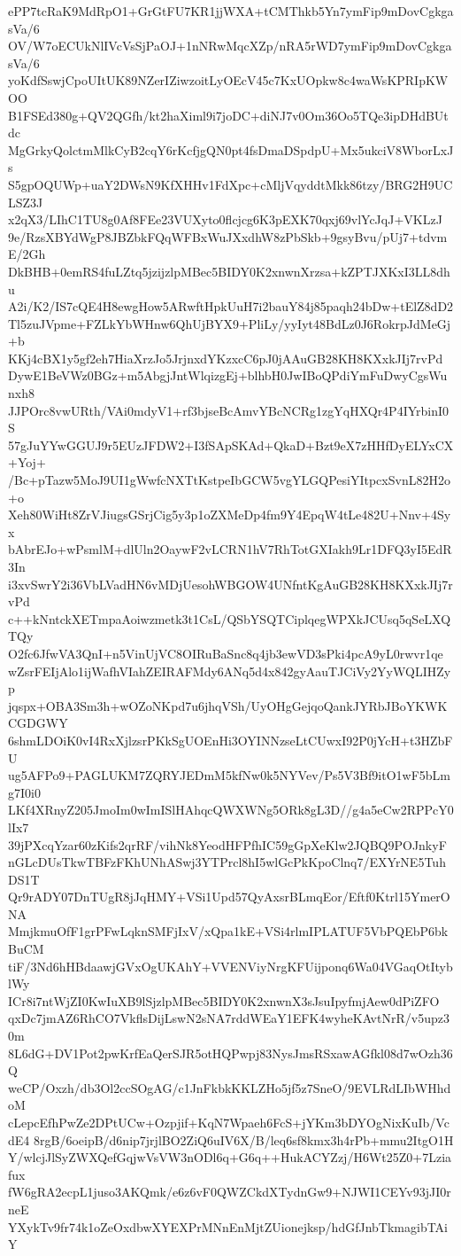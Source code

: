 ePP7tcRaK9MdRpO1+GrGtFU7KR1jjWXA+tCMThkb5Yn7ymFip9mDovCgkgasVa/6
OV/W7oECUkNlIVcVsSjPaOJ+1nNRwMqcXZp/nRA5rWD7ymFip9mDovCgkgasVa/6
yoKdfSswjCpoUItUK89NZerIZiwzoitLyOEcV45c7KxUOpkw8c4waWsKPRIpKWOO
B1FSEd380g+QV2QGfh/kt2haXiml9i7joDC+diNJ7v0Om36Oo5TQe3ipDHdBUtdc
MgGrkyQolctmMlkCyB2cqY6rKcfjgQN0pt4fsDmaDSpdpU+Mx5ukciV8WborLxJs
S5gpOQUWp+uaY2DWsN9KfXHHv1FdXpc+cMljVqyddtMkk86tzy/BRG2H9UCLSZ3J
x2qX3/LIhC1TU8g0Af8FEe23VUXyto0flcjcg6K3pEXK70qxj69vlYcJqJ+VKLzJ
9e/RzsXBYdWgP8JBZbkFQqWFBxWuJXxdhW8zPbSkb+9gsyBvu/pUj7+tdvmE/2Gh
DkBHB+0emRS4fuLZtq5jzijzlpMBec5BIDY0K2xnwnXrzsa+kZPTJXKxI3LL8dhu
A2i/K2/IS7cQE4H8ewgHow5ARwftHpkUuH7i2bauY84j85paqh24bDw+tElZ8dD2
Tl5zuJVpme+FZLkYbWHnw6QhUjBYX9+PliLy/yyIyt48BdLz0J6RokrpJdMeGj+b
KKj4cBX1y5gf2eh7HiaXrzJo5JrjnxdYKzxcC6pJ0jAAuGB28KH8KXxkJIj7rvPd
DywE1BeVWz0BGz+m5AbgjJntWlqizgEj+blhbH0JwIBoQPdiYmFuDwyCgsWunxh8
JJPOrc8vwURth/VAi0mdyV1+rf3bjseBcAmvYBcNCRg1zgYqHXQr4P4IYrbinI0S
57gJuYYwGGUJ9r5EUzJFDW2+I3fSApSKAd+QkaD+Bzt9eX7zHHfDyELYxCX+Yoj+
/Bc+pTazw5MoJ9UI1gWwfcNXTtKstpeIbGCW5vgYLGQPesiYItpcxSvnL82H2o+o
Xeh80WiHt8ZrVJiugsGSrjCig5y3p1oZXMeDp4fm9Y4EpqW4tLe482U+Nnv+4Syx
bAbrEJo+wPsmlM+dlUln2OaywF2vLCRN1hV7RhTotGXIakh9Lr1DFQ3yI5EdR3In
i3xvSwrY2i36VbLVadHN6vMDjUesohWBGOW4UNfntKgAuGB28KH8KXxkJIj7rvPd
c++kNntckXETmpaAoiwzmetk3t1CsL/QSbYSQTCiplqegWPXkJCUsq5qSeLXQTQy
O2fc6JfwVA3QnI+n5VinUjVC8OIRuBaSnc8q4jb3ewVD3sPki4pcA9yL0rwvr1qe
wZsrFEIjAlo1ijWafhVIahZEIRAFMdy6ANq5d4x842gyAauTJCiVy2YyWQLIHZyp
jqspx+OBA3Sm3h+wOZoNKpd7u6jhqVSh/UyOHgGejqoQankJYRbJBoYKWKCGDGWY
6shmLDOiK0vI4RxXjlzsrPKkSgUOEnHi3OYINNzseLtCUwxI92P0jYcH+t3HZbFU
ug5AFPo9+PAGLUKM7ZQRYJEDmM5kfNw0k5NYVev/Ps5V3Bf9itO1wF5bLmg7I0i0
LKf4XRnyZ205JmoIm0wImISlHAhqcQWXWNg5ORk8gL3D//g4a5eCw2RPPcY0lIx7
39jPXcqYzar60zKifs2qrRF/vihNk8YeodHFPfhIC59gGpXeKlw2JQBQ9POJnkyF
nGLcDUsTkwTBFzFKhUNhASwj3YTPrcl8hI5wlGcPkKpoClnq7/EXYrNE5TuhDS1T
Qr9rADY07DnTUgR8jJqHMY+VSi1Upd57QyAxsrBLmqEor/Eftf0Ktrl15YmerONA
MmjkmuOfF1grPFwLqknSMFjIxV/xQpa1kE+VSi4rlmIPLATUF5VbPQEbP6bkBuCM
tiF/3Nd6hHBdaawjGVxOgUKAhY+VVENViyNrgKFUijponq6Wa04VGaqOtItyblWy
ICr8i7ntWjZI0KwIuXB9lSjzlpMBec5BIDY0K2xnwnX3sJsuIpyfmjAew0dPiZFO
qxDc7jmAZ6RhCO7VkflsDijLswN2sNA7rddWEaY1EFK4wyheKAvtNrR/v5upz30m
8L6dG+DV1Pot2pwKrfEaQerSJR5otHQPwpj83NysJmsRSxawAGfkl08d7wOzh36Q
weCP/Oxzh/db3Ol2ccSOgAG/c1JnFkbkKKLZHo5jf5z7SneO/9EVLRdLIbWHhdoM
cLepcEfhPwZe2DPtUCw+Ozpjif+KqN7Wpaeh6FcS+jYKm3bDYOgNixKuIb/VcdE4
8rgB/6oeipB/d6nip7jrjlBO2ZiQ6uIV6X/B/leq6sf8kmx3h4rPb+mmu2ItgO1H
Y/wlcjJlSyZWXQefGqjwVsVW3nODl6q+G6q++HukACYZzj/H6Wt25Z0+7Lziafux
fW6gRA2ecpL1juso3AKQmk/e6z6vF0QWZCkdXTydnGw9+NJWI1CEYv93jJI0rneE
YXykTv9fr74k1oZeOxdbwXYEXPrMNnEnMjtZUionejksp/hdGfJnbTkmagibTAiY
